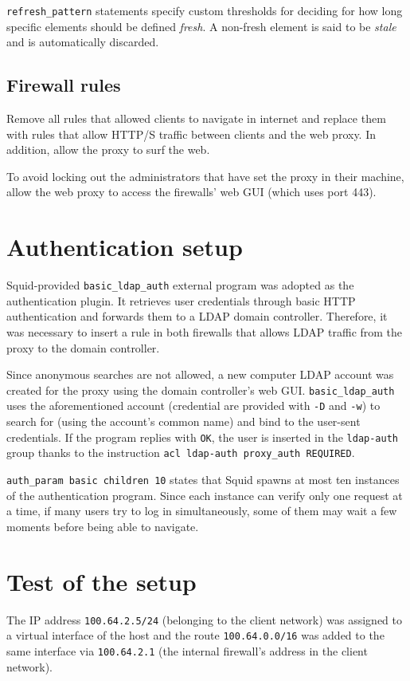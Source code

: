 \documentclass{homework}
\newcommand{\sq}{Squid\xspace}
\begin{document}
    \texttt{refresh\_pattern} statements specify custom thresholds for deciding for how long specific elements should be defined \textit{fresh}.
    A non-fresh element is said to be \textit{stale} and is automatically discarded.
    
    \subsection{Firewall rules}
    Remove all rules that allowed clients to navigate in internet and replace them with rules that allow HTTP/S traffic between clients and the web proxy.
    In addition, allow the proxy to surf the web.
    
    To avoid locking out the administrators that have set the proxy in their machine, allow the web proxy to access the firewalls' web GUI (which uses port 443).
    
    
    \section{Authentication setup}
    \sq-provided \texttt{basic\_ldap\_auth} external program was adopted as the authentication plugin.
    It retrieves user credentials through basic HTTP authentication and forwards them to a LDAP domain controller.
    Therefore, it was necessary to insert a rule in both firewalls that allows LDAP traffic from the proxy to the domain controller.
    
    Since anonymous searches are not allowed, a new computer LDAP account was created for the proxy using the domain controller's web GUI.
    \texttt{basic\_ldap\_auth} uses the aforementioned account (credential are provided with \texttt{-D} and \texttt{-w}) to search for (using the account's common name) and bind to the user-sent credentials.
    If the program replies with \texttt{OK}, the user is inserted in the \texttt{ldap-auth} group thanks to the instruction \texttt{acl ldap-auth proxy_auth REQUIRED}.
    
    \texttt{auth\_param basic children 10} states that \sq spawns at most ten instances of the authentication program.
    Since each instance can verify only one request at a time, if many users try to log in simultaneously, some of them may wait a few moments before being able to navigate.
    
    
    \section{Test of the setup}
    The IP address \texttt{100.64.2.5/24} (belonging to the client network) was assigned to a virtual interface of the host and the route \texttt{100.64.0.0/16} was added to the same interface via \texttt{100.64.2.1} (the internal firewall's address in the client network).
    
\end{document}
